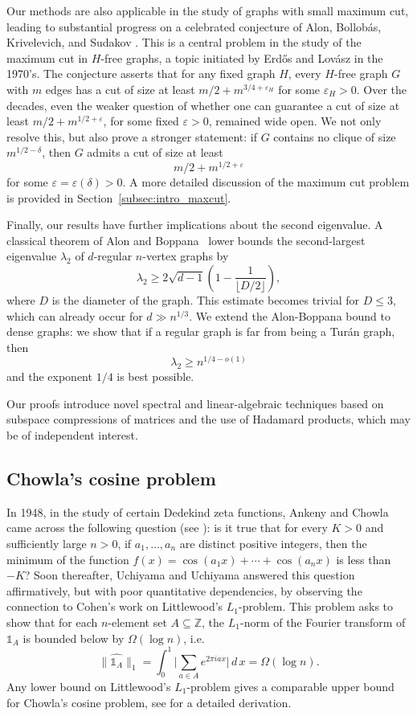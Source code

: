 \documentclass[11pt]{article}
\theoremstyle{plain}
\theoremstyle{definition}
\newcommand{\eps}{\varepsilon}
\begin{document}
Our methods are also applicable in the study of graphs with small maximum cut, leading to substantial progress on a celebrated conjecture of Alon, Bollob\'as, Krivelevich, and Sudakov \cite{ABKS}. This is a central problem in the study of the maximum cut in $H$-free graphs, a topic initiated by Erd\H{o}s and Lov\'asz \cite{erdos} in the 1970's. The conjecture asserts that for any fixed graph $H$, every $H$-free graph $G$ with $m$ edges has a cut of size at least $m/2+m^{3/4+\eps_H}$ for some $\eps_H>0$. 
Over the decades, even the weaker question of whether one can guarantee a cut of size at least $m/2+m^{1/2+\eps}$, for some fixed $\eps>0$, remained wide open.
We not only resolve this, but also prove a stronger statement: if $G$ contains no clique of size $m^{1/2-\delta}$, then $G$ admits a cut of size at least $$m/2+m^{1/2+\eps}$$ for some $\eps=\eps(\delta)>0$. A more detailed discussion of the maximum cut problem is provided in Section~\ref{subsec:intro_maxcut}.

Finally, our results have further implications about the second eigenvalue. A classical theorem of Alon and Boppana~\cite{alon-boppana} lower bounds the second-largest eigenvalue $\lambda_2$ of $d$-regular $n$-vertex graphs by $$\lambda_2\geq 2\sqrt{d-1}\left(1-\frac{1}{\lfloor D/2\rfloor}\right),$$ where $D$ is the diameter of the graph. This estimate becomes trivial for $D\leq 3$, which can already occur for $d \gg n^{1/3}$. We extend the Alon-Boppana bound to dense graphs: we show that if a regular graph is far from being a Tur\'an graph, then $$\lambda_2\geq n^{1/4-o(1)}$$ and the exponent $1/4$ is best possible. 

Our proofs introduce novel spectral and linear-algebraic techniques based on subspace compressions of matrices and the use of Hadamard products, which may be of independent interest.

\subsection{Chowla's cosine problem}\label{subsec:intro_chowla}

In 1948, in the study of certain Dedekind zeta functions, Ankeny and Chowla came across the following question (see \cite{C52}): is it true that for every $K>0$ and sufficiently large $n>0$, if $a_1, \dots, a_n$ are distinct positive integers, then the minimum of the function $f(x)=\cos(a_1 x)+\cdots+\cos (a_n x)$ is less than $-K$? Soon thereafter, Uchiyama and Uchiyama \cite{UU60} answered this question affirmatively, but with poor quantitative dependencies, by observing the connection to Cohen's work \cite{C60} on Littlewood's $L_1$-problem. This problem asks to show that for each $n$-element set $A\subseteq \mathbb{Z}$, the $L_1$-norm of the Fourier transform of $\mathds{1}_A$ is bounded below by $\Omega(\log n)$, i.e. \[\|\widehat{\mathds{1}_A}\|_1 = \int_{0}^{1}\Big|\sum_{a\in A}e^{2\pi i a x}\Big|\,d\,x=\Omega(\log n).\]
Any lower bound on Littlewood's $L_1$-problem gives a comparable upper bound for Chowla's cosine problem, see \cite{R73} for a detailed derivation. 
\end{document}
